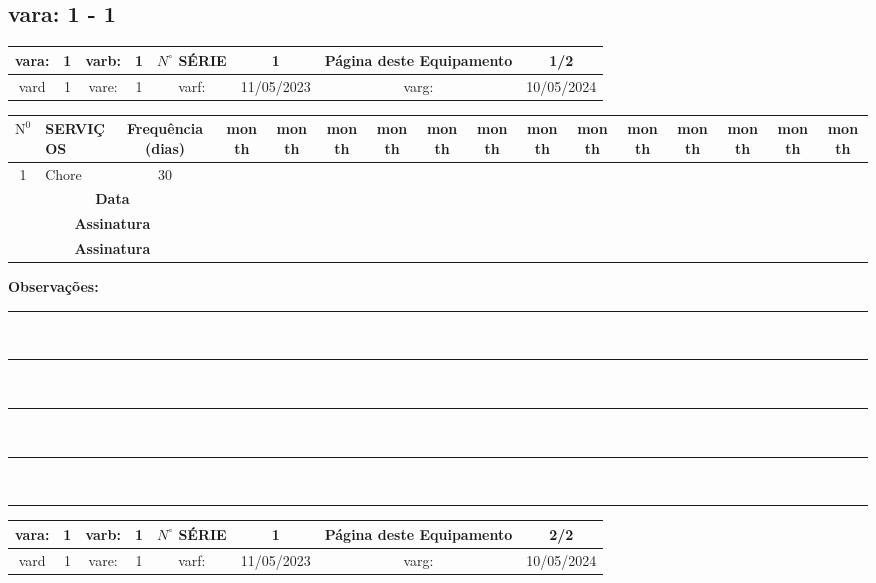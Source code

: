 \documentclass[a4paper, 12pt]{article}
\begin{document}
\subsection{vara: 1 - 1}



\begin{adjustbox}{width=18cm ,center}
\begin{tabular}{|c|c|c|c|c|c|c|c|}
\hline vara: & 1 & varb: & 1 & $N^{\circ}$ SÉRIE & 1 & \textbf{Página deste Equipamento} & \textbf{1/2} \\
\hline vard & 1 & vare: & 1 & varf: & 11/05/2023 & varg: & 10/05/2024 \\
\hline
\end{tabular}
\end{adjustbox}

\begin{adjustbox}{width=18cm ,center}
\begin{tabular}{|c|p{12cm}|c|c|c|c|c|c|c|c|c|c|c|c|c|c|}
\hline $\mathrm{N}^0$ & SERVIÇOS & Frequência (dias) & month & month & month & month & month & month & month & month & month & month & month & month & month \\
\hline 1 &  Chore & 30 &  &  & &  & &  &  & &  & &  &  &  \\
\hline
\hline
\multicolumn{3}{|c|}{\textbf{Data }} &  & & & & & & & &  &  & &  &  \\
\hline \multicolumn{3}{|c|}{\textbf{Assinatura }} &  & & & & & & & & & &   &  &  \\
\hline \multicolumn{3}{|c|}{\textbf{Assinatura }} &  & & & & & & & & & &   &  &  \\
\hline
\end{tabular}
\end{adjustbox}


\footnotesize\textbf{Observações:}\\[0.1cm]
\noindent\rule{\textwidth}{0.2mm} \\[0.1cm]
\noindent\rule{\textwidth}{0.2mm} \\[0.1cm]
\noindent\rule{\textwidth}{0.2mm} \\[0.1cm]
\noindent\rule{\textwidth}{0.2mm} \\[0.1cm]
\noindent\rule{\textwidth}{0.2mm}




\newpage
\begin{adjustbox}{width=18cm ,center}
\begin{tabular}{|c|c|c|c|c|c|c|c|}
\hline vara: & 1 & varb: & 1 & $N^{\circ}$ SÉRIE & 1 & \textbf{Página deste Equipamento} & \textbf{2/2} \\
\hline vard & 1 & vare: & 1 & varf: & 11/05/2023 & varg: & 10/05/2024 \\
\hline
\end{tabular}
\end{adjustbox}
\end{document}

